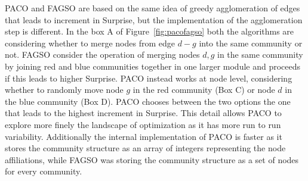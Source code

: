 PACO and FAGSO are based on the same idea of greedy agglomeration of edges that leads to increment in Surprise, but the implementation of the agglomeration step is different.
In the box A of Figure~\ref{fig:pacofagso} both the algorithms are considering whether to merge nodes from edge $d-g$ into the same community or not.
FAGSO consider the operation of merging nodes $d,g$ in the same community by joining red and blue communities together in one larger module and proceeds if this leads to higher Surprise.
PACO instead works at node level, considering whether to randomly move node $g$ in the red community (Box C) or node $d$ in the blue community (Box D). PACO chooses between the two options the one that leads to the highest increment in Surprise.
This detail allows PACO to explore more finely the landscape of optimization as it has more run to run variability. Additionally the internal implementation of PACO is faster as it stores the community structure as an array of integers representing the node affiliations, while FAGSO was storing the community structure as a set of nodes for every community.



